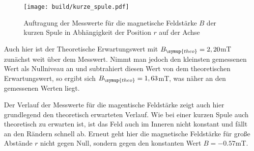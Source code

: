 \begin{figure}
  \centering
  \texttt{[image: build/kurze\_spule.pdf]}
  \caption{Auftragung der Messwerte für die magnetische Feldstärke $B$ der kurzen Spule
  in Abhängigkeit der Position $r$ auf der Achse}
  \label{fig:kurze_spule}
\end{figure}


Auch hier ist der Theoretische Erwartungswert mit $B_{\symup{theo}}=2,20$mT zunächst
weit über dem Messwert. Nimmt man jedoch den kleinsten gemessenen Wert als Nullniveau
an und subtrahiert diesen Wert von dem theoretischen Erwartungswert, so ergibt sich
$B_{\symup{theo}}=1,63$mT, was näher an den gemessenen Werten liegt.

Der Verlauf der Messwerte für die magentische Feldstärke zeigt auch hier grundlegend
den theoretisch erwarteten Verlauf. Wie bei einer kurzen Spule auch theoretisch
zu erwarten ist, ist das Feld auch im Inneren nicht konstant und fällt an den Rändern
schnell ab. Erneut geht hier die magnetische Feldstärke für große Abstände $r$ nicht
gegen Null, sondern gegen den konstanten Wert $B=-0.57$mT.


